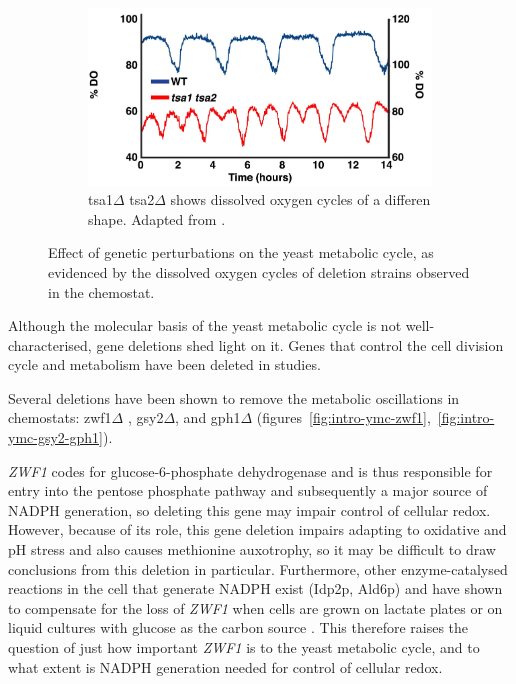 \begin{figure}
\begin{subfigure}[htpb]{0.4\textwidth}
  \end{subfigure}
  \begin{subfigure}[htpb]{0.4\textwidth}
   \centering
   \includegraphics[width=\textwidth]{caustonMetabolicCyclesYeast2015_4a_adapted}
   \caption{
     tsa1$\Delta$ tsa2$\Delta$ shows dissolved oxygen cycles of a differen shape.
     Adapted from \textcite{caustonMetabolicCyclesYeast2015}.
   }
   \label{fig:intro-ymc-tsa1-tsa2}
  \end{subfigure}
  \caption{Effect of genetic perturbations on the yeast metabolic cycle, as evidenced by the dissolved oxygen cycles of deletion strains observed in the chemostat.}
  \label{fig:intro-ymc-del}
\end{figure}

Although the molecular basis of the yeast metabolic cycle is not well-characterised, gene deletions shed light on it.
Genes that control the cell division cycle and metabolism have been deleted in studies.

Several deletions have been shown to remove the metabolic oscillations in chemostats: zwf1$\Delta$ \parencite{tuCyclicChangesMetabolic2007}, gsy2$\Delta$, and gph1$\Delta$ \parencite{oneillEukaryoticCellBiology2020} (figures~\ref{fig:intro-ymc-zwf1},~\ref{fig:intro-ymc-gsy2-gph1}).

\emph{ZWF1} codes for glucose-6-phosphate dehydrogenase and is thus responsible for entry into the pentose phosphate pathway and subsequently a major source of NADPH generation, so deleting this gene may impair control of cellular redox.
However, because of its role, this gene deletion impairs adapting to oxidative and pH stress and also causes methionine auxotrophy, so it may be difficult to draw conclusions from this deletion in particular.
Furthermore, other enzyme-catalysed reactions in the cell that generate NADPH exist (Idp2p, Ald6p) and have shown to compensate for the loss of \emph{ZWF1} when cells are grown on lactate plates or on liquid cultures with glucose as the carbon source \parencite{minardSourcesNADPHYeast2005}.
This therefore raises the question of just how important \emph{ZWF1} is to the yeast metabolic cycle, and to what extent is NADPH generation needed for control of cellular redox.

